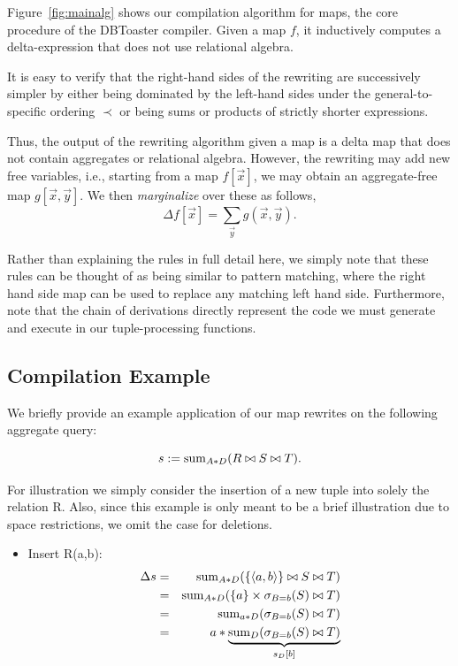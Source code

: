 \documentclass{vldb}
\newcommand{\tuple}[1]{{\langle#1\rangle}}
\begin{document}
Figure~\ref{fig:mainalg} shows our compilation algorithm for maps, the core
procedure of the DBToaster compiler. Given a map $f$, it inductively computes a
delta-expression that does not use relational algebra.

It is easy to verify that the right-hand sides of the rewriting are successively
simpler by either being dominated by the left-hand sides under the general-to-specific
ordering $\prec$ or being sums or products of
strictly shorter expressions.

Thus, the output of the rewriting algorithm given a map is a delta map that does not
contain aggregates or relational algebra. However, the rewriting may add new free
variables, i.e., starting from a map $f[\vec{x}]$, we may obtain an aggregate-free
map $g[\vec{x}, \vec{y}]$. We then {\em marginalize}\/ over these as follows,
\[
\Delta f[\vec{x}] = \sum_{\vec{y}} g(\vec{x}, \vec{y}). 
\]

Rather than explaining the rules in full detail here, we simply note that these
rules can be thought of as being similar to pattern matching, where the right
hand side map can be used to replace any matching left hand side. Furthermore,
note that the chain of derivations directly represent the code we must generate
and execute in our tuple-processing functions.

\subsection{Compilation Example}
We briefly provide an example application of our map rewrites on the following
aggregate query:

\[
s := \mathrm{sum}_{A*D}(R \bowtie S \bowtie T).
\]

For illustration we simply consider the insertion of a new tuple into
solely the relation R. Also, since this example is only meant to be a brief
illustration due to space restrictions, we omit the case for deletions.

\begin{itemize}
\item
Insert R(a,b):
\begin{eqnarray*}
\Delta s &=& \algsum_{A*D}(\{\tuple{a,b}\} \bowtie S \bowtie T)
\\ &=&
\algsum_{A*D}(\{a\} \times \sigma_{B=b}(S) \bowtie T)
\\ &=&
\algsum_{a*D}(\sigma_{B=b}(S) \bowtie T)
\\ &=&
a * \underbrace{\algsum_{D}(\sigma_{B=b}(S) \bowtie T)}_{s_D[b]}
\end{eqnarray*}

\end{itemize}
\end{document}
